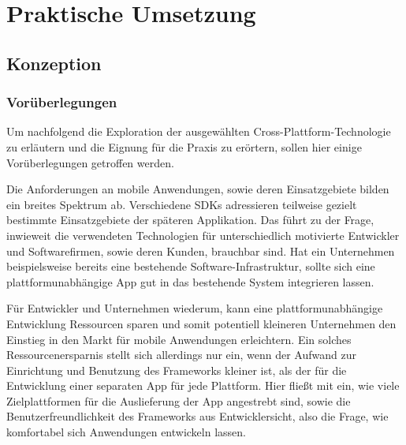 \part{Praktische Umsetzung} \label{sec:praxis} 

\chapter{Konzeption}	

\section{Vorüberlegungen}	\label{sec:kriterien}
	
	
 	Um nachfolgend die Exploration der ausgewählten Cross-Plattform-Technologie zu erläutern und die Eignung für die Praxis zu erörtern, sollen hier einige Vorüberlegungen getroffen werden.
 	
 	Die Anforderungen an mobile Anwendungen, sowie deren Einsatzgebiete bilden ein breites Spektrum ab. Verschiedene SDKs adressieren teilweise gezielt bestimmte Einsatzgebiete der späteren Applikation. Das führt zu der Frage, inwieweit die verwendeten Technologien für unterschiedlich motivierte Entwickler und Softwarefirmen, sowie deren Kunden, brauchbar sind. Hat ein Unternehmen beispielsweise bereits eine bestehende Software-Infrastruktur, sollte sich eine plattformunabhängige App gut in das bestehende System integrieren lassen.
 	
 	Für Entwickler und Unternehmen wiederum, kann eine plattformunabhängige Entwicklung Ressourcen sparen und somit potentiell kleineren Unternehmen den Einstieg in den Markt für mobile Anwendungen erleichtern. 
 	Ein solches Ressourcenersparnis stellt sich allerdings nur ein, wenn der Aufwand zur Einrichtung und Benutzung des Frameworks kleiner ist, als der für die Entwicklung einer separaten App für jede Plattform. 
 	Hier fließt mit ein, wie viele Zielplattformen für die Auslieferung der App angestrebt sind, sowie die Benutzerfreundlichkeit des Frameworks aus Entwicklersicht, also die Frage, wie komfortabel sich Anwendungen entwickeln lassen.
 	
